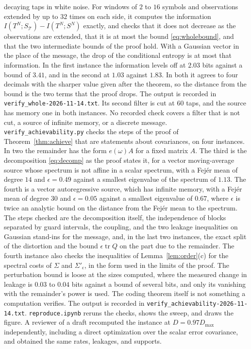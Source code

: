 \documentclass[11pt,onecolumn]{IEEEtran}
\newcommand{\tr}{\operatorname{tr}}
\begin{document}
decaying taps in white noise. For windows of $2$ to $16$ symbols and
observations extended by up to $32$ times on each side, it computes the
information $I(T^N;S_{\mathcal T})-I(T^N;S^N)$ exactly, and checks that
it does not decrease as the observations are extended, that it is at
most the bound \eqref{eq:wholebound}, and that the two intermediate
bounds of the proof hold. With a Gaussian vector in the place of the
message, the drop of the conditional entropy is at most that
information. In the first instance the information levels off at
$2.03$ bits against a bound of $3.41$, and in the second at $1.03$
against $1.83$. In both it agrees to four decimals with the sharper
value given after the theorem, so the distance from the bound is the
two terms that the proof drops. The output is recorded in
\texttt{verify\_whole-2026-11-14.txt}. Its second filter is cut at $60$ taps, and the source has
memory one in both instances. No recorded check covers a filter that
is not cut, a source of infinite memory, or a discrete message.
\texttt{verify\_achievability.py} checks the steps of the proof of
Theorem~\ref{thm:achieve} that are statements about covariances, on
four instances. In two the remainder has the form $e(\omega)A$ for a
fixed matrix $A$. The third is the decomposition \eqref{eq:decomp} as
the proof states it, for a vector moving-average source whose spectrum
is not affine in a scalar spectrum, with a Fej\'er mean of degree $14$
and $\epsilon=0.49$ against a smallest eigenvalue of the spectrum of
$1.13$. The fourth is a vector autoregressive source, which has
infinite memory, with a Fej\'er mean of degree $30$ and
$\epsilon=0.05$ against a smallest eigenvalue of $0.67$, where
$\epsilon$ is twice an analytic bound on the distance from the Fej\'er
mean to the spectrum. The steps checked are the decomposition itself, the independence
of blocks separated by guard intervals, the coupling, and the two
leakage inequalities on Gaussian stand-ins for the message, and, in the
last two instances, the exact split of the distortion and the bound
$\epsilon\tr Q$ on the part due to the remainder. The fourth instance
also checks the inequalities of Lemma~\ref{lem:order}(c) for the
spectral costs of $\Sigma$ and $\Sigma'_\epsilon$, in the form used in the
limits of the proof. The
perturbation bound is loose at the sizes computed, where the measured
change in leakage is $0.03$ to $0.04$ bits against a bound of several
bits, and
only its vanishing with the remainder's power is used. The coding
theorem itself is not something a computation verifies. The output is
recorded in \texttt{verify\_achievability-2026-11-14.txt}.
\texttt{reproduce.ipynb} reruns the checks, shows the sweep, and draws
the figure. A reviewer of a draft recomputed the instance at
$D=0.97D_{\max}$ independently, including a direct optimization over the
scalar error covariance, and obtained the same rates, leakages, and
supports.
\end{document}
